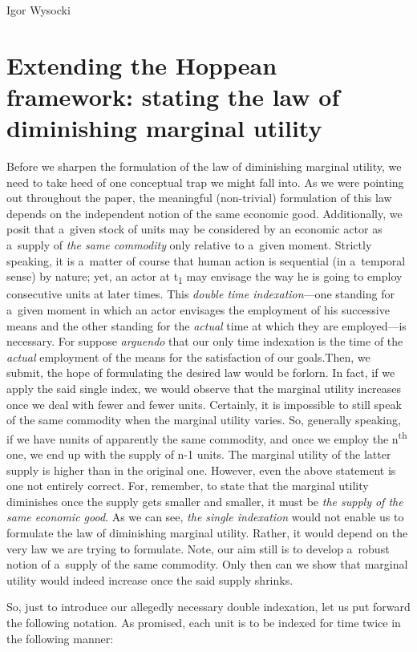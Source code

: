 \begin{artengenv}{Igor Wysocki}
\section{Extending the Hoppean framework: stating the law of diminishing marginal utility }
Before we sharpen the formulation of the law of diminishing marginal utility, we need to take heed of one conceptual trap we might fall into. As we were pointing out throughout the paper, the meaningful (non-trivial) formulation of this law depends on the independent notion of the same economic good. Additionally, we posit that a~given stock of units may be considered by an economic actor as a~supply of \textit{the same commodity} only relative to a~given moment. Strictly speaking, it is a~matter of course that human action is sequential (in a~temporal sense) by nature; yet, an actor at t\textsubscript{1} may envisage the way he is going to employ consecutive units at later times. This \textit{double time indexation}---one standing for a~given moment in which an actor envisages the employment of his successive means and the other standing for the \textit{actual} time at which they are employed---is necessary. For suppose \textit{arguendo} that our only time indexation is the time of the \textit{actual} employment of the means for the satisfaction of our goals.Then, we submit, the hope of formulating the desired law would be forlorn. In fact, if we apply the said single index, we would observe that the marginal utility increases once we deal with fewer and fewer units. Certainly, it is impossible to still speak of the same commodity when the marginal utility varies. So, generally speaking, if we have nunits of apparently the same commodity, and once we employ the n\textsuperscript{th} one, we end up with the supply of n-1 units. The marginal utility of the latter supply is higher than in the original one. However, even the above statement is one not entirely correct. For, remember, to state that the marginal utility diminishes once the supply gets smaller and smaller, it must be \textit{the supply of the same economic good}. As we can see, \textit{the single indexation} would not enable us to formulate the law of diminishing marginal utility. Rather, it would depend on the very law we are trying to formulate. Note, our aim still is to develop a~robust notion of a~supply of the same commodity. Only then can we show that marginal utility would indeed increase once the said supply shrinks.

So, just to introduce our allegedly necessary double indexation, let us put forward the following notation. As promised, each unit is to be indexed for time twice in the following manner:


\end{artengenv}
